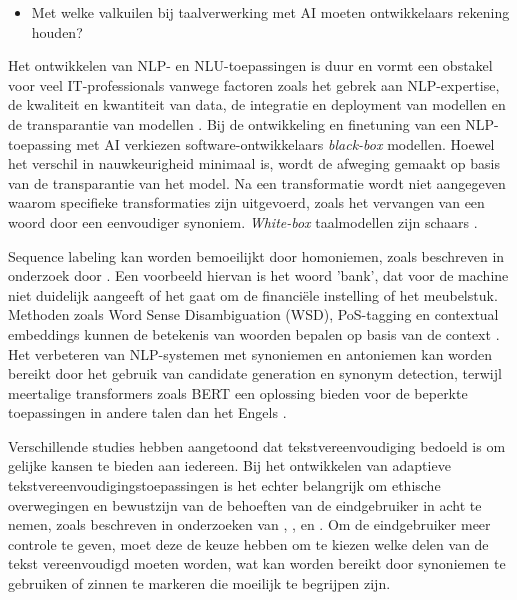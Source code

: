 \begin{itemize}
	\item Met welke valkuilen bij taalverwerking met AI moeten ontwikkelaars rekening houden?
\end{itemize}

\medspace

Het ontwikkelen van NLP- en NLU-toepassingen is duur en vormt een obstakel voor veel IT-professionals vanwege factoren zoals het gebrek aan NLP-expertise, de kwaliteit en kwantiteit van data, de integratie en deployment van modellen en de transparantie van modellen \autocite{IBM2022}. Bij de ontwikkeling en finetuning van een NLP-toepassing met AI verkiezen software-ontwikkelaars \textit{black-box} modellen. Hoewel het verschil in nauwkeurigheid minimaal is, wordt de afweging gemaakt op basis van de transparantie van het model. Na een transformatie wordt niet aangegeven waarom specifieke transformaties zijn uitgevoerd, zoals het vervangen van een woord door een eenvoudiger synoniem. \textit{White-box} taalmodellen zijn schaars \autocite{Punardeep2020}.

\medspace 

Sequence labeling kan worden bemoeilijkt door homoniemen, zoals beschreven in onderzoek door \textcite{Roldos2020}. Een voorbeeld hiervan is het woord 'bank', dat voor de machine niet duidelijk aangeeft of het gaat om de financiële instelling of het meubelstuk. Methoden zoals Word Sense Disambiguation (WSD), PoS-tagging en contextual embeddings kunnen de betekenis van woorden bepalen op basis van de context \autocite{Eisenstein2019, Liu2020}. Het verbeteren van NLP-systemen met synoniemen en antoniemen kan worden bereikt door het gebruik van candidate generation en synonym detection, terwijl meertalige transformers zoals BERT een oplossing bieden voor de beperkte toepassingen in andere talen dan het Engels \autocite{Dandekar2016, Roldos2020}.

\medspace

Verschillende studies hebben aangetoond dat tekstvereenvoudiging bedoeld is om gelijke kansen te bieden aan iedereen. Bij het ontwikkelen van adaptieve tekstvereenvoudigingstoepassingen is het echter belangrijk om ethische overwegingen en bewustzijn van de behoeften van de eindgebruiker in acht te nemen, zoals beschreven in onderzoeken van \textcite{Niemeijer2010}, \textcite{Xu2015}, en \textcite{Gooding2022}. Om de eindgebruiker meer controle te geven, moet deze de keuze hebben om te kiezen welke delen van de tekst vereenvoudigd moeten worden, wat kan worden bereikt door synoniemen te gebruiken of zinnen te markeren die moeilijk te begrijpen zijn.


